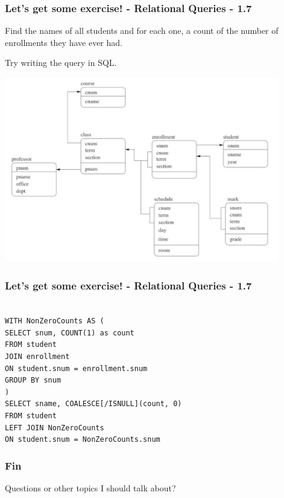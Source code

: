 \begin{frame}
\frametitle{Let's get some exercise! - Relational Queries - 1.7}

Find the names of all students and for each one, a count of the number of enrollments they have ever had.

Try writing the query in SQL.

\begin{center}
  \includegraphics[width=0.9\textwidth]{images/db-schema.png}
\end{center}

\end{frame}


\begin{frame}
\frametitle{Let's get some exercise! - Relational Queries - 1.7}


\texttt{ \\
  WITH NonZeroCounts AS ( \\
    SELECT snum, COUNT(1) as count \\
    FROM student \\
    JOIN enrollment \\
    ON student.snum = enrollment.snum \\
    GROUP BY snum \\
  ) \\
  SELECT sname, COALESCE[/ISNULL](count, 0) \\
  FROM student \\
  LEFT JOIN NonZeroCounts \\
  ON student.snum = NonZeroCounts.snum \\
}


\end{frame}


\begin{frame}
\frametitle{Fin}

Questions or other topics I should talk about?

\end{frame}

